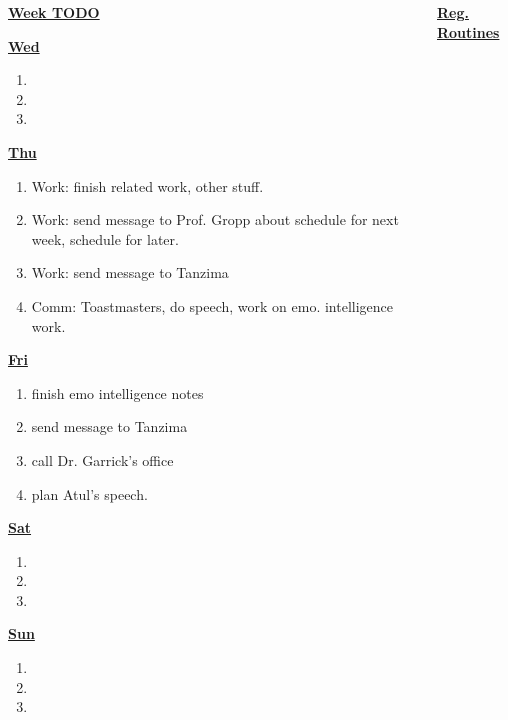 \documentclass[serif,mathserif,final]{beamer}
\begin{document}
\begin{frame}{}
\begin{columns}[t]
\begin{column}{0.33\linewidth}{\textbf{\underline{Week TODO}}}
\begin{block}
\textbf{\underline{Wed}}
\begin{enumerate} 
\tiny \item \tiny 
\item \tiny 
\item \tiny 
\end{enumerate} 

\textbf{\underline{Thu}}
\begin{enumerate} 
\tiny \item \tiny Work: finish related work, other stuff. 
\item \tiny Work: send message to Prof. Gropp about schedule for next
  week, schedule for later. 
\item \tiny Work: send message to Tanzima 

\item \tiny Comm: Toastmasters, do speech, work on emo. intelligence
  work. 

\end{enumerate} 

\textbf{\underline{Fri}}

\begin{enumerate} 
\tiny \item \tiny finish emo intelligence notes 
\item \tiny send message to Tanzima 
\item \tiny call Dr. Garrick's office 
\item \tiny plan Atul's speech. 
\end{enumerate} 

\textbf{\underline{Sat}}

\begin{enumerate} 
\tiny \item \tiny 
\item \tiny 
\item \tiny 
\end{enumerate} 


\textbf{\underline{Sun}}

\begin{enumerate} 
\tiny \item \tiny 
\item \tiny 
\item \tiny 
\end{enumerate} 

\end{block} 

\end{column}%

\begin{column}{0.27\linewidth} {\textbf{\underline{Reg. Routines}}}


\end{column}
\end{columns}
\end{frame}
\end{document}
